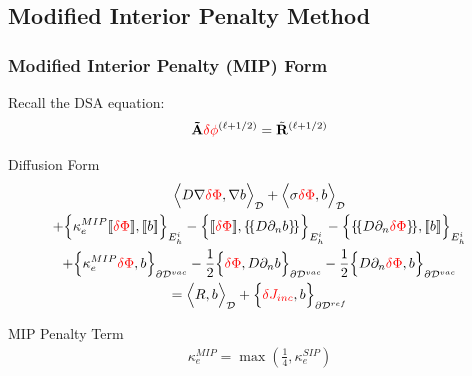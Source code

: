 \documentclass[compress,10pt]{beamer}
\renewcommand{\vec}[1]{\mathbf{#1}}
\newcommand{\tcr}[1]{\textcolor{red}{#1}}
\begin{document}
\subsection{Modified Interior Penalty Method}
\begin{frame}[t]\frametitle{\small Modified Interior Penalty (MIP) Form}
\vspace{-3mm}
Recall the DSA equation:
\begin{equation*}
{\bf \tilde{A}} \tcr{\delta \phi}^{(\ell+1/2)} = \tilde{{\bf R}}^{(\ell+1/2)}
\end{equation*}
\vspace{-4mm}
\begin{block}{Diffusion Form}{\footnotesize
\begin{gather*}
\Big<  D \vec{\nabla} \tcr{\delta \Phi} , \vec{\nabla} b  \Big>_{\mathcal{D}} 
+ \Big<  \sigma \tcr{\delta  \Phi} ,  b  \Big>_{\mathcal{D}}    \\
+ \Big\{ \kappa_e^{MIP} [\![ \tcr{\delta  \Phi} ]\!] , [\![  b ]\!]\Big\}_{E_h^i} 
- \Big\{  [\![  \tcr{\delta \Phi} ]\!] , \{\!\{  D \partial_n b \}\!\}\Big\}_{E_h^i} 
- \Big\{ \{\!\{  D \partial_n \tcr{\delta \Phi} \}\!\} , [\![ b ]\!]\Big\}_{E_h^i} \\
+ \Big\{ \kappa_e^{MIP} \tcr{\delta \Phi} ,   b \Big\}_{\partial \mathcal{D}^{vac}} -  \frac{1}{2} \Big\{  \tcr{\delta \Phi}  ,  D \partial_n b \Big\}_{\partial \mathcal{D}^{vac}} -  \frac{1}{2} \Big\{   D \partial_n \tcr{\delta \Phi} ,   b \Big\}_{\partial \mathcal{D}^{vac}}  \\
 = \Big<  R , b  \Big>_{\mathcal{D}}  +  \Big\{  \tcr{\delta J_{inc}}, b  \Big\}_{\partial \mathcal{D}^{ref}}
\end{gather*} }
\end{block}
	\begin{block}{MIP Penalty Term}{\footnotesize
		\begin{align*}
			\kappa_e^{MIP} = \max(\frac{1}{4},  \kappa_e^{SIP})
		\end{align*} }
	\end{block}
\end{frame}
\end{document}
